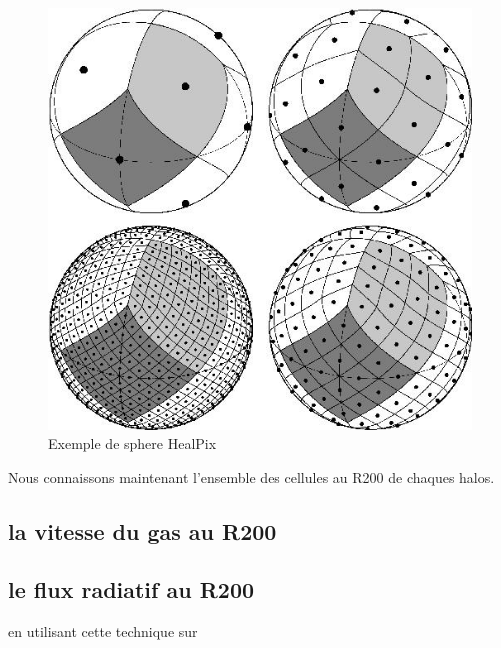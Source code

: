 \begin{figure}[bth]
        \includegraphics[width=.95\linewidth]{img/03/healpix.jpg} 
        \caption{Exemple de sphere HealPix}
 		\label{fig:HealPix}
\end{figure}

Nous connaissons maintenant l'ensemble des cellules au R200 de chaques halos.

\subsection{la vitesse du gas au R200}

\subsection{le flux radiatif au R200}
en utilisant cette technique sur 